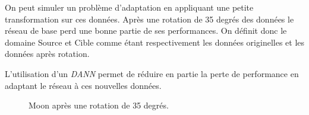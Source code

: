 On peut simuler un problème d'adaptation en appliquant une petite
transformation sur ces données.
Après une rotation de 35 degrés des données le réseau de base perd une bonne
partie de ses performances. On définit donc le domaine Source et Cible
comme étant respectivement les données originelles et les données après
rotation.

L'utilisation d'un \emph{DANN} permet de réduire en partie la perte de 
performance en adaptant le réseau à ces nouvelles données.

\begin{figure}[htbp]
\centering
{}
\hfill
{}
\caption{Moon après une rotation de 35 degrés.}


\end{figure}
